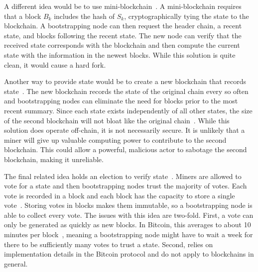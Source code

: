 
A different idea would be to use mini-blockchain~\cite{bruce2014Miniblockchain}.
A mini-blockchain requires that a block $B_k$ includes the hash of $S_k$, cryptographically tying the state to the blockchain.
A bootstrapping node can then request the header chain, a recent state, and blocks following the recent state.
The new node can verify that the received state corresponds with the blockchain and then compute the current state with the information in the newest blocks.
While this solution is quite clean, it would cause a hard fork.


Another way to provide state would be to create a new blockchain that records state~\cite{marsalek2019BockSummariesSeparateChain}.
The new blockchain records the state of the original chain every so often and bootstrapping nodes can eliminate the need for blocks prior to the most recent summary.
Since each state exists independently of all other states, the size of the second blockchain will not bloat like the original chain~\cite{marsalek2019BockSummariesSeparateChain}.
While this solution does operate off-chain, it is not necessarily secure.
It is unlikely that a miner will give up valuable computing power to contribute to the second blockchain.
This could allow a powerful, malicious actor to sabotage the second blockchain, making it unreliable.


The final related idea holds an election to verify state~\cite{matzutt2020HowTSPrune}.
Miners are allowed to vote for a state and then bootstrapping nodes trust the majority of votes.
Each vote is recorded in a block and each block has the capacity to store a single vote~\cite{matzutt2020HowTSPrune}.
Storing votes in blocks makes them immutable, so a bootstrapping node is able to collect every vote.
The issues with this idea are two-fold.
First, a vote can only be generated as quickly as new blocks.
In Bitcoin, this averages to about 10 minutes per block~\cite{nakamoto2009Bitcoin}, meaning a bootstrapping node might have to wait a week for there to be sufficiently many votes to trust a state.
Second, \cite{matzutt2020HowTSPrune} relies on implementation details in the Bitcoin protocol and do not apply to blockchains in general.
